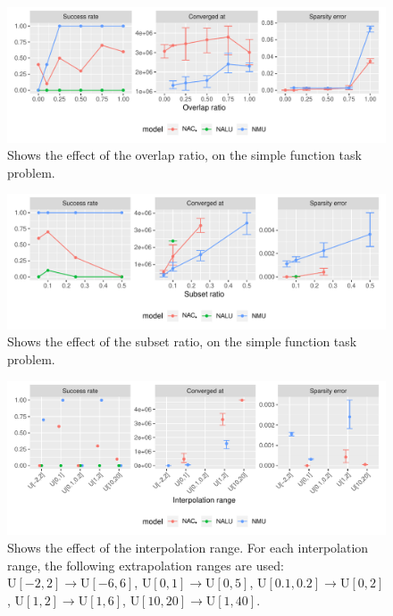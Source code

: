 \begin{figure}[h]
\centering
\includegraphics[width=\linewidth]{results/simple_function_static_overlap.pdf}
\caption{Shows the effect of the overlap ratio, on the simple function task problem.}
\label{fig:simple-fnction-static-overlap}
\end{figure}

\begin{figure}[h]
\centering
\includegraphics[width=\linewidth]{results/simple_function_static_subset.pdf}
\caption{Shows the effect of the subset ratio, on the simple function task problem.}
\label{fig:simple-fnction-static-subset}
\end{figure}

\begin{figure}[h]
\centering
\includegraphics[width=\linewidth]{results/simple_function_static_range.pdf}
\caption{Shows the effect of the interpolation range. For each interpolation range, the following extrapolation ranges are used: ${\mathrm{U}[-2,2] \rightarrow \mathrm{U}[-6,6]}$, ${\mathrm{U}[0,1] \rightarrow \mathrm{U}[0,5]}$, ${\mathrm{U}[0.1,0.2] \rightarrow \mathrm{U}[0,2]}$, ${\mathrm{U}[1,2] \rightarrow \mathrm{U}[1,6]}$, ${\mathrm{U}[10, 20] \rightarrow \mathrm{U}[1, 40]}$.}
\label{fig:simple-fnction-static-range}
\end{figure}

